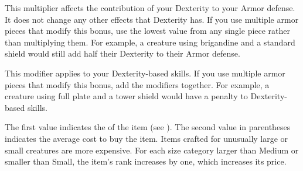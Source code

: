      This multiplier affects the contribution of your Dexterity to your Armor defense.
    It does not change any other effects that Dexterity has.
    If you use multiple armor pieces that modify this bonus, use the lowest value from any single piece rather than multiplying them.
    For example, a creature using brigandine and a standard shield would still add half their Dexterity to their Armor defense.

     This modifier applies to your Dexterity-based skills.
    If you use multiple armor pieces that modify this bonus, add the modifiers together.
    For example, a creature using full plate and a tower shield would have a  penalty to Dexterity-based skills.

     The first value indicates the  of the item (see ).
    The second value in parentheses indicates the average cost to buy the item.
    Items crafted for unusually large or small creatures are more expensive.
    For each size category larger than Medium or smaller than Small, the item's rank increases by one, which increases its price.

